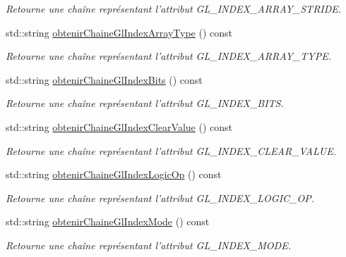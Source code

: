 \begin{DoxyCompactItemize}
\begin{DoxyCompactList}\small\item\em Retourne une chaîne représentant l'attribut G\-L\-\_\-\-I\-N\-D\-E\-X\-\_\-\-A\-R\-R\-A\-Y\-\_\-\-S\-T\-R\-I\-D\-E. \end{DoxyCompactList}\item 
std\-::string \hyperlink{group__utilitaire_ga8479c06a3ede7442505bb38803be818f}{obtenir\-Chaine\-Gl\-Index\-Array\-Type} () const 
\begin{DoxyCompactList}\small\item\em Retourne une chaîne représentant l'attribut G\-L\-\_\-\-I\-N\-D\-E\-X\-\_\-\-A\-R\-R\-A\-Y\-\_\-\-T\-Y\-P\-E. \end{DoxyCompactList}\item 
std\-::string \hyperlink{group__utilitaire_gae88fc4ca05d447c04f08671823a407a3}{obtenir\-Chaine\-Gl\-Index\-Bits} () const 
\begin{DoxyCompactList}\small\item\em Retourne une chaîne représentant l'attribut G\-L\-\_\-\-I\-N\-D\-E\-X\-\_\-\-B\-I\-T\-S. \end{DoxyCompactList}\item 
std\-::string \hyperlink{group__utilitaire_gad0d02a72c93d1501432001b500bf6435}{obtenir\-Chaine\-Gl\-Index\-Clear\-Value} () const 
\begin{DoxyCompactList}\small\item\em Retourne une chaîne représentant l'attribut G\-L\-\_\-\-I\-N\-D\-E\-X\-\_\-\-C\-L\-E\-A\-R\-\_\-\-V\-A\-L\-U\-E. \end{DoxyCompactList}\item 
std\-::string \hyperlink{group__utilitaire_ga5294ee67327c1a604fe1ac627d539acc}{obtenir\-Chaine\-Gl\-Index\-Logic\-Op} () const 
\begin{DoxyCompactList}\small\item\em Retourne une chaîne représentant l'attribut G\-L\-\_\-\-I\-N\-D\-E\-X\-\_\-\-L\-O\-G\-I\-C\-\_\-\-O\-P. \end{DoxyCompactList}\item 
std\-::string \hyperlink{group__utilitaire_ga5413d656a860db0103e85dcd025970e8}{obtenir\-Chaine\-Gl\-Index\-Mode} () const 
\begin{DoxyCompactList}\small\item\em Retourne une chaîne représentant l'attribut G\-L\-\_\-\-I\-N\-D\-E\-X\-\_\-\-M\-O\-D\-E. \end{DoxyCompactList}\item 

\end{DoxyCompactItemize}
